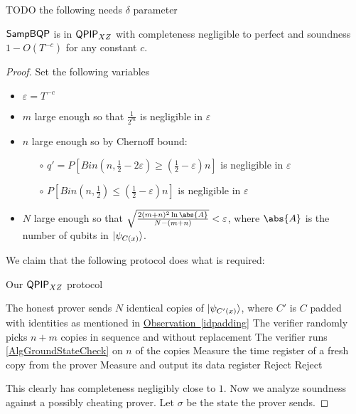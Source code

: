 TODO the following needs $\delta$ parameter
\begin{theorem}
	$\operatorname{\mathsf{SampBQP}}$ is in $\operatorname{\mathsf{QPIP}}_{XZ}$ with completeness negligible to perfect and soundness $1-O(T^{-c})$ for any constant $c$.
\end{theorem}
\begin{proof}

	Set the following variables
	\begin{itemize}
		\item $\varepsilon=T^{-c}$
		\item $m$ large enough so that $\frac{1}{2^m}$ is negligible in $\varepsilon$
		\item $n$ large enough so by Chernoff bound:
			\begin{itemize}
				\item[$\circ$] $q'=P\left[Bin(n, \frac{1}{2}-2\varepsilon)\geq\left(\frac{1}{2}-\varepsilon\right)n\right]$ is negligible in $\varepsilon$
				\item[$\circ$] $P\left[Bin(n, \frac{1}{2})\leq\left(\frac{1}{2}-\varepsilon\right)n\right]$ is negligible in $\varepsilon$
			\end{itemize}
		\item $N$ large enough so that $\sqrt{\frac{2(m+n)^2\ln\abs{A}}{N-(m+n)}}<\varepsilon$, where $\abs{A}$ is the number of qubits in $\ket{\psi_{C(x)}}$.
	\end{itemize}

	We claim that the following protocol does what is required:
	\begin{algorithm}
		\caption{Our $\operatorname{\mathsf{QPIP}}_{XZ}$ protocol}
		\label{AlgAmp1}
		\begin{algorithmic}[1]
			\State The honest prover sends $N$ identical copies of $\ket{\psi_{C'(x)}}$, where $C'$ is $C$ padded with identities as mentioned in \hyperref[idpadding]{Observation~\ref*{idpadding}}
			\State The verifier randomly picks $n+m$ copies in sequence and without replacement
			\State The verifier runs \autoref{AlgGroundStateCheck} on $n$ of the copies
				\State Measure the time register of a fresh copy from the prover
					\State Measure and output its data register
				\EndIf
			\EndFor
			\State Reject
			\Else
			\State Reject
			\EndIf
		\end{algorithmic}
	\end{algorithm}

	This clearly has completeness negligibly close to $1$. Now we analyze soundness against a possibly cheating prover. Let $\sigma$ be the state the prover sends.


\end{proof}
